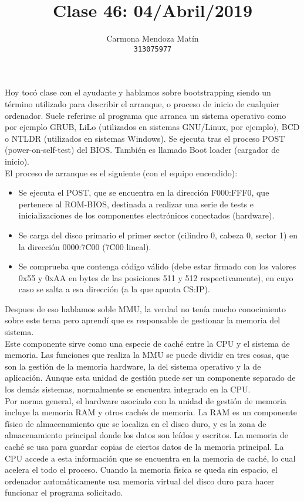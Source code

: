 \documentclass[11pt, a4paper]{report}
\begin{document}
\title{Clase 46: 04/Abril/2019}
\author{
  Carmona Mendoza Mat\'in\\
  \texttt{313075977}
}
\date{}
\maketitle

Hoy tocó clase con el ayudante y hablamos sobre bootstrapping siendo un término
utilizado para describir el arranque, o proceso de inicio de cualquier
ordenador. Suele referirse al programa que arranca un sistema operativo como
por ejemplo GRUB, LiLo (utilizados en sistemas GNU/Linux, por ejemplo), BCD o
NTLDR (utilizados en sistemas Windows). Se ejecuta tras el proceso POST
(power-on-self-test) del BIOS. También es llamado Boot loader (cargador de
inicio). \\

El proceso de arranque es el siguiente (con el equipo encendido):

\begin{itemize}
\item Se ejecuta el POST, que se encuentra en la dirección F000:FFF0, que
  pertenece al ROM-BIOS, destinada a realizar una serie de tests e
  inicializaciones de los componentes electrónicos conectados (hardware).
\item Se carga del disco primario el primer sector (cilindro 0, cabeza 0,
  sector 1) en la dirección 0000:7C00 (7C00 lineal).
\item Se comprueba que contenga código válido (debe estar firmado con los
  valores 0x55 y 0xAA en bytes de las posiciones 511 y 512 respectivamente), en
  cuyo caso se salta a esa dirección (a la que apunta CS:IP).
\end{itemize}

Despues de eso hablamos soble MMU, la verdad no tenía mucho conocimiento sobre
este tema pero aprendí que es responsable de gestionar la memoria del sistema. \\

Este componente sirve como una especie de caché entre la CPU y el sistema de
memoria. Las funciones que realiza la MMU se puede dividir en tres cosas, que
son la gestión de la memoria hardware, la del sistema operativo y la de
aplicación. Aunque esta unidad de gestión puede ser un componente separado de
los demás sistemas, normalmente se encuentra integrado en la CPU. \\

Por norma general, el hardware asociado con la unidad de gestión de memoria
incluye la memoria RAM y otros cachés de memoria. La RAM es un componente
físico de almacenamiento que se localiza en el disco duro, y es la zona de
almacenamiento principal donde los datos son leídos y escritos. La memoria de
caché se usa para guardar copias de ciertos datos de la memoria principal.  La
CPU accede a esta información que se encuentra en la memoria de caché, lo cual
acelera el todo el proceso. Cuando la memoria física se queda sin espacio, el
ordenador automáticamente usa memoria virtual del disco duro para hacer
funcionar el programa solicitado. \\
\end{document}
